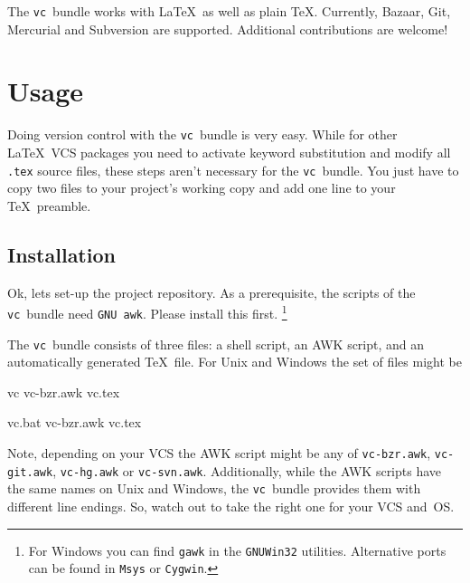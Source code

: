 \documentclass[11pt]{article}
\newlength{\sbslistingwd}
\newcommand*{\pkg}{\texttt{vc}}
\begin{document}
The \pkg\ bundle works with \LaTeX\ as well as plain \TeX.  Currently,
Bazaar, Git, Mercurial and Subversion are supported.  Additional contributions are
welcome!



\section{Usage}
\label{sec:usage}
Doing version control with the \pkg\ bundle is very easy.  While for
other \LaTeX\ VCS packages you need to activate keyword substitution and
modify all \texttt{.tex} source files, these steps aren't necessary for
the \pkg\ bundle.  You just have to copy two files to your project's
working copy and add one line to your \TeX\ preamble.


\subsection{Installation}
\label{sec:installation}
Ok, lets set-up the project repository.  As a prerequisite, the scripts
of the \pkg\ bundle need \texttt{GNU awk}.  Please install this first.%
\footnote{For Windows you can find \texttt{gawk} in the
  \texttt{GNUWin32} utilities.  Alternative ports can be found in
  \texttt{Msys} or \texttt{Cygwin}.} %

The \pkg\ bundle consists of three files: a shell script, an AWK script,
and an automatically generated \TeX\ file.  For Unix and Windows the set
of files might be\newline
\begin{minipage}{\textwidth}
  \begin{minipage}[t]{\sbslistingwd}
    \begin{listing}[style=text, title=Unix\strut]
vc
vc-bzr.awk
vc.tex
    \end{listing}
  \end{minipage}\hfill
  \begin{minipage}[t]{\sbslistingwd}
    \begin{listing}[style=text, title=Windows\strut]
vc.bat
vc-bzr.awk
vc.tex
    \end{listing}
  \end{minipage}
\end{minipage}
Note, depending on your VCS the AWK script might be any of
\texttt{vc-bzr.awk}, \texttt{vc-git.awk}, \texttt{vc-hg.awk} or \texttt{vc-svn.awk}.
Additionally, while the AWK scripts have the same names on Unix and
Windows, the \pkg\ bundle provides them with different line endings.
So, watch out to take the right one for your VCS and~OS.
\end{document}
